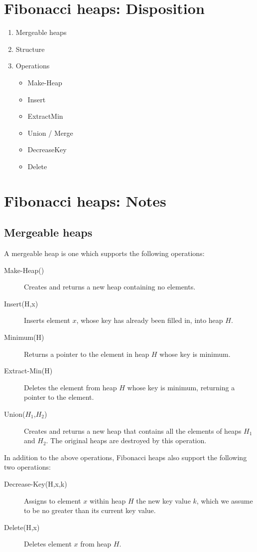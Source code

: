 \section{Fibonacci heaps: Disposition}
\begin{enumerate}
	\item Mergeable heaps
	\item Structure
	\item Operations
	\begin{itemize}
		\item Make-Heap
		\item Insert
		\item ExtractMin
		\item Union / Merge
		\item DecreaseKey
		\item Delete
	\end{itemize}
\end{enumerate}

\section{Fibonacci heaps: Notes}

\subsection{Mergeable heaps}
A mergeable heap is one which supports the following operations:
%
\begin{description}
	\item[Make-Heap()] Creates and returns a new heap containing no elements.
	\item[Insert(H,x)] Inserts element $x$, whose key has already been filled in,
	into heap $H$.
	\item[Minimum(H)] Returns a pointer to the element in heap $H$ whose key is minimum.
	\item[Extract-Min(H)] Deletes the element from heap $H$ whose key is minimum,
	returning a pointer to the element.
	\item[Union($H_1$,$H_2$)] Creates and returns a new heap
	that contains all the elements of heaps $H_1$ and $H_2$.
	The original heaps are destroyed by this operation.
\end{description}
%
In addition to the above operations, Fibonacci heaps also
support the following two operations:
%
\begin{description}
	\item[Decrease-Key(H,x,k)] Assigns to element $x$ within
	heap $H$ the new key value $k$, which we assume to be no
	greater than its current key value.
	\item[Delete(H,x)] Deletes element $x$ from heap $H$.
\end{description}

